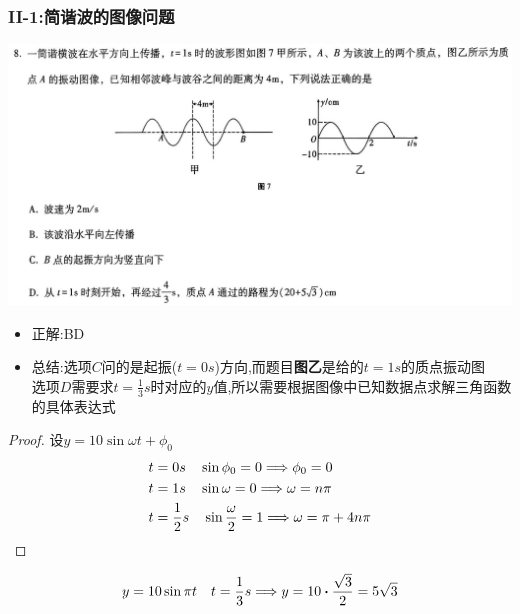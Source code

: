 \documentclass{article}
\begin{document}
\vspace{2em}

\subsubsection{II-1:简谐波的图像问题}
\includegraphics[width=50em,keepaspectratio]{./pictures/3.1-2.png}

\begin{itemize}
    \item 正解:\quad BD
    \item 总结:\quad 选项$C$问的是起振($t=0s$)方向,而题目\textbf{图乙}是给的$t=1s$的质点振动图\\
          选项$D$需要求$t=\frac{1}{3}s$时对应的$y$值,所以需要根据图像中已知数据点求解三角函数的具体表达式
\end{itemize}

\begin{proof}
    设$ y = 10 \sin{\omega t + \phi_{0}}$
    \begin{align*}
        t & = 0s \quad \sin{\phi_{0}} = 0 \Longrightarrow \phi_{0} = 0                           \\
        t & = 1s \quad \sin{\omega} = 0 \Longrightarrow \omega = n\pi                            \\
        t & = \frac{1}{2}s \quad \sin{\frac{\omega}{2}} = 1 \Longrightarrow \omega = \pi + 4n\pi
    \end{align*}
\end{proof}
$$
    y = 10\sin{\pi t} \quad t = \frac{1}{3}s \lra y = 10 \vdot \frac{\sqrt{3}}{2} = 5\sqrt{3}
$$

\vspace{2em}
\end{document}
